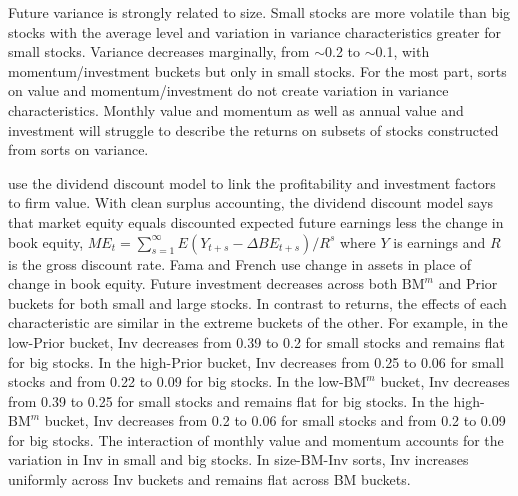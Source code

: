 
Future variance is strongly related to size. Small stocks are more volatile
than big stocks with the average level and variation in variance
characteristics greater for small stocks. Variance decreases marginally, from
$\sim$0.2 to $\sim$0.1, with momentum/investment buckets but only in small
stocks. For the most part, sorts on value and momentum/investment do not create
variation in variance characteristics. Monthly value and momentum as well as
annual value and investment will struggle to describe the returns on subsets of
stocks constructed from sorts on variance.

\textcite{fama2006profitability} use the dividend discount model to link the
profitability and investment factors to firm value.
With clean surplus accounting, the dividend discount model says that market
equity equals discounted expected future earnings less the change in book
equity,
$ME_t = \sum_{s=1}^\infty E(Y_{t+s}-\Delta BE_{t+s})/R^s$
where $Y$ is earnings and $R$ is the gross discount rate.
Fama and French use change in assets in place of change in book equity.
Future investment decreases across both $\text{BM}^m$ and Prior buckets for
both small and large stocks. In contrast to returns, the effects of each
characteristic are similar in the extreme buckets of the other. For example, in
the low-Prior bucket, Inv decreases from 0.39 to 0.2 for small stocks and
remains flat for big stocks. In the high-Prior bucket, Inv decreases from 0.25
to 0.06 for small stocks and from 0.22 to 0.09 for big stocks. In the
low-$\text{BM}^m$ bucket, Inv decreases from 0.39 to 0.25 for small stocks and
remains flat for big stocks. In the high-$\text{BM}^m$ bucket, Inv decreases
from 0.2 to 0.06 for small stocks and from 0.2 to 0.09 for big stocks. The
interaction of monthly value and momentum accounts for the variation in Inv in
small and big stocks. In size-BM-Inv sorts, Inv increases uniformly across Inv
buckets and remains flat across BM buckets.

